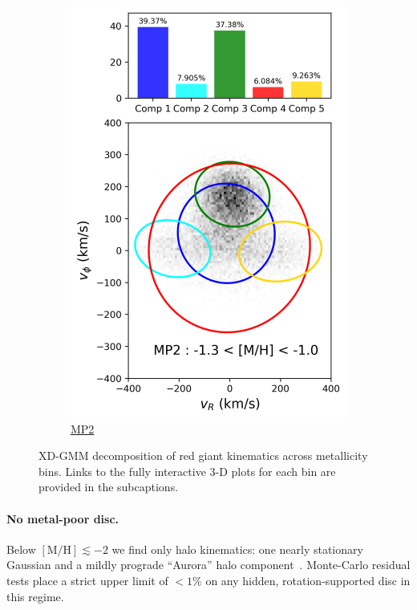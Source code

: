 \documentclass[a4paper,10pt]{article}
\begin{document}
\begin{multicols}{2}
\begin{figure}[H]
\begin{subfigure}[t]{0.24\linewidth}
    \includegraphics[width=\linewidth]{../figures/gmm_MP2.png}
    \caption{\href{https://raw.githack.com/raunaq-rai/Disentangling-the-Milky-Way-using-GMM/main/figures/MP2\_\_-1.3\%5BM\_H\%5D-1.0.html}{MP2}}
    \label{fig:gmm_mp2}
  \end{subfigure}

  \caption{XD-GMM decomposition of red giant kinematics across metallicity bins. Links to the fully interactive 3-D plots for each bin are provided in the subcaptions.}
  \label{fig:gmm_zhang}
\end{figure}

\paragraph{No metal-poor disc.}
Below $\mathrm{[M/H]}\lesssim-2$ we find only halo kinematics: one
nearly stationary Gaussian and a mildly prograde “Aurora” halo
component~\cite{Belokurov2022}.  Monte-Carlo residual tests place a strict
upper limit of $<1\%$ on any hidden, rotation-supported disc in this regime.


\end{multicols}
\end{document}
